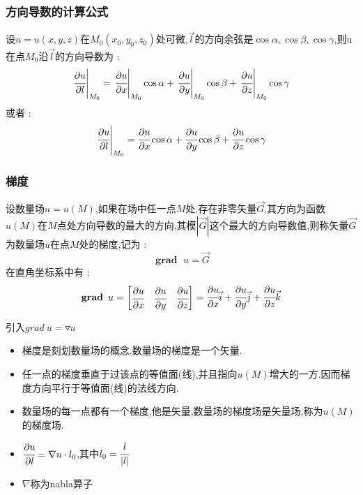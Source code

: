 \documentclass[UTF8,12pt]{ctexbook}
\newcommand{\directionDerivative}[3]{\left.\cfrac{\partial #1}{\partial #2}\right|_{#3}}
\newcommand{\partialDerivativeFrac}[2]{\cfrac{\partial #1}{\partial #2}}
\DeclareMathOperator{\gradText}{\mathbf{grad}\ }
\begin{document}
{{{{    \subsubsection{方向导数的计算公式}{
      设$u= u(x,y,z)$在$M_0(x_0,y_0,z_0)$处可微,$\vec{l}$的方向余弦是$\cos\alpha,\cos\beta,\cos\gamma$,则u在点$M_0$沿$\vec{l}$的方向导数为 :
      $$
        \directionDerivative{u}{l}{M_0} = \directionDerivative{u}{x}{M_0}\cos\alpha + \directionDerivative{u}{y}{M_0}\cos\beta + \directionDerivative{u}{z}{M_0}\cos\gamma
      $$
      或者 :
      $$
        \directionDerivative{u}{l}{M_0} = \partialDerivativeFrac{u}{x}\cos\alpha + \partialDerivativeFrac{u}{y}\cos\beta + \partialDerivativeFrac{u}{z}\cos\gamma
      $$
    }%

    \subsubsection{梯度}{
      设数量场$u = u(M)$,如果在场中任一点$M$处,存在非零矢量$\vec{G}$,其方向为函数$u(M)$在$M$点处方向导数的最大的方向,其模$|\vec{G}|$这个最大的方向导数值,则称矢量$\vec{G}$为数量场$u$在点$M$处的梯度,记为 :
      $$
        \gradText u = \vec{G}
      $$
      在直角坐标系中有 :
      $$
        \gradText u = \begin{bmatrix}
          \partialDerivativeFrac{u}{x} & \partialDerivativeFrac{u}{y} & \partialDerivativeFrac{u}{z}
        \end{bmatrix} = \partialDerivativeFrac{u}{x}\vec{i} + \partialDerivativeFrac{u}{y}\vec{j} + \partialDerivativeFrac{u}{z}\vec{k}
      $$

      引入$grad\ u = \triangledown u$

      \begin{itemize}
        \item 梯度是刻划数量场的概念.数量场的梯度是一个矢量.
        \item 任一点的梯度垂直于过该点的等值面(线),并且指向$u(M)$增大的一方.因而梯度方向平行于等值面(线)的法线方向.
        \item 数量场的每一点都有一个梯度,他是矢量,数量场的梯度场是矢量场,称为$u(M)$的梯度场.
        \item $\partialDerivativeFrac{u}{l} = \nabla u \cdot l_0$,其中$l_0= \cfrac{l}{|l|}$
        \item $\nabla$称为nabla算子
      \end{itemize}
    }%

}}}}
\end{document}

